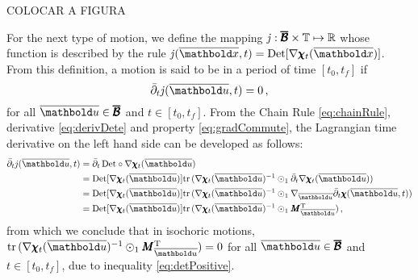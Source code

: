 COLOCAR A FIGURA 

\noindent For the next type of motion, we define the mapping $\mathit{j} : \pmb{\overline{\mathcal{B}}}\times\mathbb{T} \mapsto \mathbb{R}$ whose function is described by the rule $\mathit{j}(\overline{\vto{x}},t)=\textnormal{Det}[\fua{\nabla\tnr{\chi}_t}{\overline{\vto{x}}}]$. From this definition, a motion is said to be  in a period of time $[t_0,t_f]$ if 
\begin{equation}\label{eq:isochoricMotion}
\bar{\partial}_t\mathit{j}(\overline{\vto{u}},t) = 0\,,
\end{equation}
for all $\overline{\vto{u}} \in \tnr{\overline{\mathcal{B}}}$ and $t\in[t_0,t_f]$. From the Chain Rule \eqref{eq:chainRule}, derivative \eqref{eq:derivDete} and property \eqref{eq:gradCommute}, the Lagrangian time derivative on the left hand side can be developed as follows:
\begin{align}
\bar{\partial}_t\mathit{j}(\overline{\vto{u}},t)&= \bar{\partial}_t\,\textnormal{Det}\circ\fua{\nabla\tnr{\chi}_t}{\overline{\vto{u}}}\nonumber\\
&=\textnormal{Det}[\fua{\nabla\tnr{\chi}_t}{\overline{\vto{u}}}]\trc{\fua{\nabla\tnr{\chi}_t}{\overline{\vto{u}}}^{-1}\odot_1\bar{\partial}_t\fua{\nabla\tnr{\chi}_t}{\overline{\vto{u}}}}\nonumber\\
&=\textnormal{Det}[\fua{\nabla\tnr{\chi}_t}{\overline{\vto{u}}}]\trc{\fua{\nabla\tnr{\chi}_t}{\overline{\vto{u}}}^{-1}\odot_1\fua{\nabla_{\overline{\vto{u}}}\bar{\partial}_t\tnr{\chi}}{\overline{\vto{u}},t}}\nonumber\\
&=\textnormal{Det}[\fua{\nabla\tnr{\chi}_t}{\overline{\vto{u}}}]\trc{\fua{\nabla\tnr{\chi}_t}{\overline{\vto{u}}}^{-1}\odot_1\tnr{M}_{\overline{\vto{u}}}^\text{T}}\,,
\end{align}
from which we conclude that in isochoric motions, $\trc{\fua{\nabla\tnr{\chi}_t}{\overline{\vto{u}}}^{-1}\odot_1\tnr{M}_{\overline{\vto{u}}}^\text{T}}=0$ for all $\overline{\vto{u}} \in \tnr{\overline{\mathcal{B}}}$ and $t\in[t_0,t_f]$, due to inequality \eqref{eq:detPositive}.

